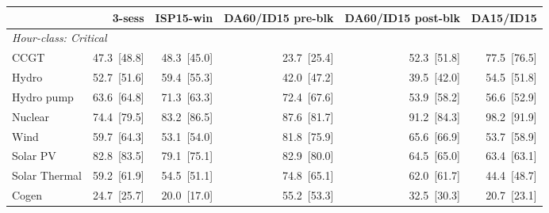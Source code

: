 \begin{tabular}{l r r r r r}
\toprule
 & 3-sess & ISP15-win & DA60/ID15 pre-blk & DA60/ID15 post-blk & DA15/ID15 \\
\midrule
\multicolumn{6}{l}{\textit{Hour-class: Critical}} \\
CCGT & 47.3~{\color{seasoncol}\scriptsize[48.8]} & 48.3~{\color{seasoncol}\scriptsize[45.0]} & 23.7~{\color{seasoncol}\scriptsize[25.4]} & 52.3~{\color{seasoncol}\scriptsize[51.8]} & 77.5~{\color{seasoncol}\scriptsize[76.5]} \\
Hydro & 52.7~{\color{seasoncol}\scriptsize[51.6]} & 59.4~{\color{seasoncol}\scriptsize[55.3]} & 42.0~{\color{seasoncol}\scriptsize[47.2]} & 39.5~{\color{seasoncol}\scriptsize[42.0]} & 54.5~{\color{seasoncol}\scriptsize[51.8]} \\
Hydro pump & 63.6~{\color{seasoncol}\scriptsize[64.8]} & 71.3~{\color{seasoncol}\scriptsize[63.3]} & 72.4~{\color{seasoncol}\scriptsize[67.6]} & 53.9~{\color{seasoncol}\scriptsize[58.2]} & 56.6~{\color{seasoncol}\scriptsize[52.9]} \\
Nuclear & 74.4~{\color{seasoncol}\scriptsize[79.5]} & 83.2~{\color{seasoncol}\scriptsize[86.5]} & 87.6~{\color{seasoncol}\scriptsize[81.7]} & 91.2~{\color{seasoncol}\scriptsize[84.3]} & 98.2~{\color{seasoncol}\scriptsize[91.9]} \\
Wind & 59.7~{\color{seasoncol}\scriptsize[64.3]} & 53.1~{\color{seasoncol}\scriptsize[54.0]} & 81.8~{\color{seasoncol}\scriptsize[75.9]} & 65.6~{\color{seasoncol}\scriptsize[66.9]} & 53.7~{\color{seasoncol}\scriptsize[58.9]} \\
Solar PV & 82.8~{\color{seasoncol}\scriptsize[83.5]} & 79.1~{\color{seasoncol}\scriptsize[75.1]} & 82.9~{\color{seasoncol}\scriptsize[80.0]} & 64.5~{\color{seasoncol}\scriptsize[65.0]} & 63.4~{\color{seasoncol}\scriptsize[63.1]} \\
Solar Thermal & 59.2~{\color{seasoncol}\scriptsize[61.9]} & 54.5~{\color{seasoncol}\scriptsize[51.1]} & 74.8~{\color{seasoncol}\scriptsize[65.1]} & 62.0~{\color{seasoncol}\scriptsize[61.7]} & 44.4~{\color{seasoncol}\scriptsize[48.7]} \\
Cogen & 24.7~{\color{seasoncol}\scriptsize[25.7]} & 20.0~{\color{seasoncol}\scriptsize[17.0]} & 55.2~{\color{seasoncol}\scriptsize[53.3]} & 32.5~{\color{seasoncol}\scriptsize[30.3]} & 20.7~{\color{seasoncol}\scriptsize[23.1]} \\

\end{tabular}
